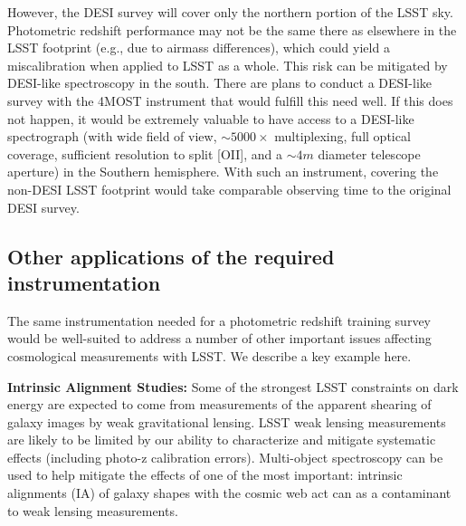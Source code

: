 However, the DESI survey will cover only the northern portion of the LSST sky.  Photometric redshift performance may not be the same there as elsewhere in the LSST footprint (e.g., due to airmass differences), which could yield a miscalibration when applied to LSST as a whole.  This risk can be mitigated by DESI-like spectroscopy in the south.  There are plans to conduct a DESI-like survey with the 4MOST instrument that would fulfill this need well.  If this does not happen, it would be extremely valuable to have access to a DESI-like spectrograph (with wide field of view, $\sim 5000\times$ multiplexing, full optical coverage, sufficient resolution to split [OII], and a $\sim 4m$ diameter telescope aperture) in the Southern hemisphere.  With such an instrument, covering the non-DESI LSST footprint would take comparable observing time to the original DESI survey.

\subsection{Other applications of the required instrumentation}

The same instrumentation needed for a photometric redshift training survey would be well-suited to address a number of other important issues  affecting cosmological measurements with LSST.  We describe a key example here.

{\bf Intrinsic Alignment Studies:} Some of the strongest LSST constraints on dark energy are expected to come from measurements of the apparent shearing of galaxy images by weak gravitational lensing.  LSST weak lensing measurements are likely to be limited by our ability to characterize and mitigate systematic effects (including photo-z calibration errors). Multi-object spectroscopy can be used to help mitigate the effects of one of the most important: intrinsic alignments (IA) of galaxy shapes with the cosmic web act can as a contaminant to weak lensing measurements.

